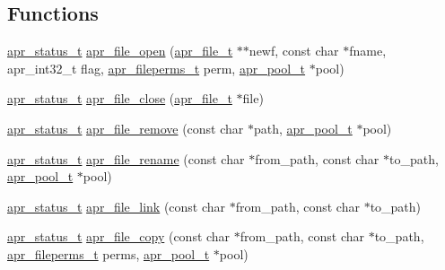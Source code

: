 \subsection*{Functions}
\begin{DoxyCompactItemize}
\item 
\hyperlink{group__apr__errno_gaf76ee4543247e9fb3f3546203e590a6c}{apr\+\_\+status\+\_\+t} \hyperlink{group__apr__file__io_gabda14cbf242fb4fe99055434213e5446}{apr\+\_\+file\+\_\+open} (\hyperlink{group__apr__file__io_gaa46e4763ac375ea3c7a43ba6f6099e22}{apr\+\_\+file\+\_\+t} $\ast$$\ast$newf, const char $\ast$fname, apr\+\_\+int32\+\_\+t flag, \hyperlink{group__apr__file__info_ga3af19c4c47007169064a70f9351bc7d8}{apr\+\_\+fileperms\+\_\+t} perm, \hyperlink{group__apr__pools_gaf137f28edcf9a086cd6bc36c20d7cdfb}{apr\+\_\+pool\+\_\+t} $\ast$pool)
\item 
\hyperlink{group__apr__errno_gaf76ee4543247e9fb3f3546203e590a6c}{apr\+\_\+status\+\_\+t} \hyperlink{group__apr__file__io_ga5607bce1c4c798ceb6c8475a998a81a1}{apr\+\_\+file\+\_\+close} (\hyperlink{group__apr__file__io_gaa46e4763ac375ea3c7a43ba6f6099e22}{apr\+\_\+file\+\_\+t} $\ast$file)
\item 
\hyperlink{group__apr__errno_gaf76ee4543247e9fb3f3546203e590a6c}{apr\+\_\+status\+\_\+t} \hyperlink{group__apr__file__io_ga211c40be82f8bf8b8d7dce5afca5500b}{apr\+\_\+file\+\_\+remove} (const char $\ast$path, \hyperlink{group__apr__pools_gaf137f28edcf9a086cd6bc36c20d7cdfb}{apr\+\_\+pool\+\_\+t} $\ast$pool)
\item 
\hyperlink{group__apr__errno_gaf76ee4543247e9fb3f3546203e590a6c}{apr\+\_\+status\+\_\+t} \hyperlink{group__apr__file__io_ga29b5633bb80226baa5de79a83c6999aa}{apr\+\_\+file\+\_\+rename} (const char $\ast$from\+\_\+path, const char $\ast$to\+\_\+path, \hyperlink{group__apr__pools_gaf137f28edcf9a086cd6bc36c20d7cdfb}{apr\+\_\+pool\+\_\+t} $\ast$pool)
\item 
\hyperlink{group__apr__errno_gaf76ee4543247e9fb3f3546203e590a6c}{apr\+\_\+status\+\_\+t} \hyperlink{group__apr__file__io_gaa7911275c0e97edc064b8167be658f9e}{apr\+\_\+file\+\_\+link} (const char $\ast$from\+\_\+path, const char $\ast$to\+\_\+path)
\item 
\hyperlink{group__apr__errno_gaf76ee4543247e9fb3f3546203e590a6c}{apr\+\_\+status\+\_\+t} \hyperlink{group__apr__file__io_ga2b82c441246cc4596795420b0a94a9a2}{apr\+\_\+file\+\_\+copy} (const char $\ast$from\+\_\+path, const char $\ast$to\+\_\+path, \hyperlink{group__apr__file__info_ga3af19c4c47007169064a70f9351bc7d8}{apr\+\_\+fileperms\+\_\+t} perms, \hyperlink{group__apr__pools_gaf137f28edcf9a086cd6bc36c20d7cdfb}{apr\+\_\+pool\+\_\+t} $\ast$pool)
$$
\end{DoxyCompactItemize}
